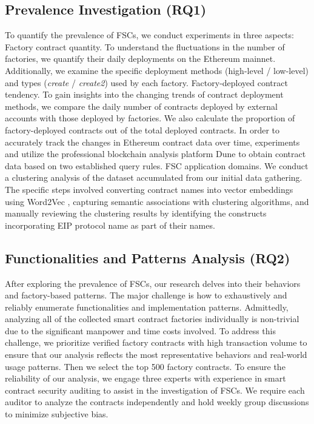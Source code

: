 \documentclass[acmsmall,screen]{acmart}
\begin{document}
	\subsection{Prevalence Investigation (RQ1)}
	To quantify the prevalence of FSCs, we conduct experiments in three aspects:  Factory contract quantity. To understand the fluctuations in the number of factories, we quantify their daily deployments on the Ethereum mainnet. Additionally, we examine the specific deployment methods (high-level / low-level) and types (\textit{create} / \textit{create2}) used by each factory.  Factory-deployed contract tendency. To gain insights into the changing trends of contract deployment methods, we compare the daily number of contracts deployed by external accounts with those deployed by factories. We also calculate the proportion of factory-deployed contracts out of the total deployed contracts. In order to accurately track the changes in Ethereum contract data over time, experiments  and  utilize the professional blockchain analysis platform Dune \cite{dunedashboard} to obtain contract data based on two established query rules.  FSC application domains. We conduct a clustering analysis of the dataset accumulated from our initial data gathering. The specific steps involved converting contract names into vector embeddings using Word2Vec \cite{DBLP:journals/corr/word2vec}, capturing semantic associations with clustering algorithms, and manually reviewing the clustering results by identifying the constructs incorporating EIP protocol name as part of their names.


	\subsection{Functionalities and Patterns Analysis (RQ2)}
	After exploring the prevalence of FSCs, our research delves into their behaviors and factory-based patterns. The major challenge is how to exhaustively and reliably enumerate functionalities and implementation patterns. Admittedly, analyzing all of the collected smart contract factories individually is non-trivial due to the significant manpower and time costs involved. To address this challenge, we prioritize verified factory contracts with high transaction volume to ensure that our analysis reflects the most representative behaviors and real-world usage patterns. Then we select the top 500 factory contracts. To ensure the reliability of our analysis, we engage three experts with experience in smart contract security auditing to assist in the investigation of FSCs. We require each auditor to analyze the contracts independently and hold weekly group discussions to minimize subjective bias.
\end{document}
